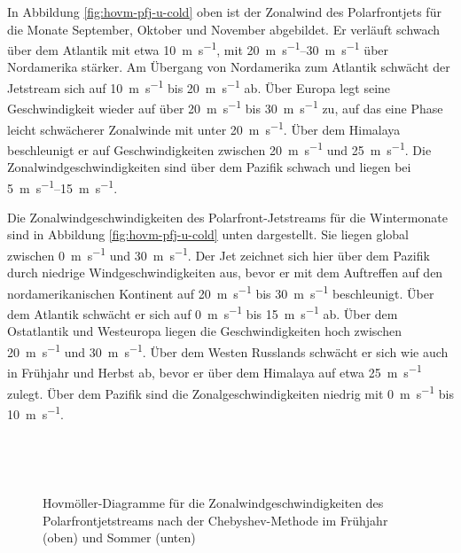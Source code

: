 In Abbildung \ref{fig:hovm-pfj-u-cold} oben ist der Zonalwind des Polarfrontjets für die Monate September, Oktober und November abgebildet. Er verläuft schwach über dem Atlantik mit etwa \SI{10}{\metre\per\second}, mit \SIrange{20}{30}{\metre\per\second} über Nordamerika stärker. Am Übergang von Nordamerika zum Atlantik schwächt der Jetstream sich auf \SI{10}{\metre\per\second} bis \SI{20}{\metre\per\second} ab. Über Europa legt seine Geschwindigkeit wieder auf über \SI{20}{\metre\per\second} bis \SI{30}{\metre\per\second} zu, auf das eine Phase leicht schwächerer Zonalwinde mit unter \SI{20}{\metre\per\second}. Über dem Himalaya beschleunigt er auf Geschwindigkeiten zwischen \SI{20}{\metre\per\second} und \SI{25}{\metre\per\second}. Die Zonalwindgeschwindigkeiten sind über dem Pazifik schwach und liegen bei \SIrange{5}{15}{\metre\per\second}.


Die Zonalwindgeschwindigkeiten des Polarfront-Jetstreams für die Wintermonate sind in Abbildung \ref{fig:hovm-pfj-u-cold} unten dargestellt. Sie liegen global zwischen \SI{0}{\metre\per\second} und \SI{30}{\metre\per\second}. Der Jet zeichnet sich hier über dem Pazifik durch niedrige Windgeschwindigkeiten aus, bevor er mit dem Auftreffen auf den nordamerikanischen Kontinent auf \SI{20}{\metre\per\second} bis \SI{30}{\metre\per\second} beschleunigt. Über dem Atlantik schwächt er sich auf \SI{0}{\metre\per\second} bis \SI{15}{\metre\per\second} ab. Über dem Ostatlantik und Westeuropa liegen die Geschwindigkeiten hoch zwischen \SI{20}{\metre\per\second} und \SI{30}{\metre\per\second}. Über dem Westen Russlands schwächt er sich wie auch in Frühjahr und Herbst ab, bevor er über dem Himalaya auf etwa \SI{25}{\metre\per\second} zulegt. Über dem Pazifik sind die Zonalgeschwindigkeiten niedrig mit \SI{0}{\metre\per\second} bis \SI{10}{\metre\per\second}.



\begin{figure} %
  \centering
  \begin{minipage}{\textwidth}
    \centering
  \end{minipage} \\ 
    \begin{minipage}{\textwidth}
      \centering
  \end{minipage} \\ 
  \caption[Hovmöllerdiagramme des Zonalwinds des Polarfrontjets nach Chebyshev im Frühjahr und Sommer]{Hovmöller-Diagramme für die Zonalwindgeschwindigkeiten des Polarfrontjetstreams nach der Chebyshev-Methode im Frühjahr (oben) und Sommer (unten)} \label{fig:hovm-pfj-u-warm}
\end{figure}

